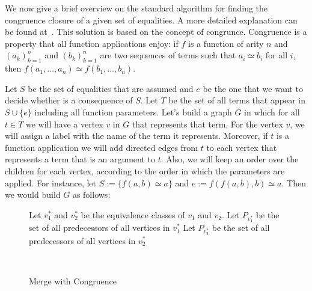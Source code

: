 We now give a brief overview on the standard algorithm for finding the congruence closure of a given set of equalities. A more detailed explanation can be found at~\cite{orig_cong_clos}. This solution is based on the concept of congrunce.
Congruence is a property that all function applications enjoy:
if $f$ is a function of arity $n$ and ${(a_{k})}_{k = 1}^{n}$ and ${(b_{k})}_{k = 1}^{n}$ are two sequences of terms such that $a_{i} \simeq b_{i}$ for all $i$, then
$f(a_{1}, \ldots, a_{n}) \simeq f(b_{1}, \ldots, b_{n})$.


Let $S$ be the set of equalities that are assumed and $e$ be the one that we want to decide whether is a consequence of $S$. Let $T$ be the set of all terms that appear in $S \cup \{e\}$ including all function parameters. Let's build a graph $G$ in which for all $t \in T$ we will have a vertex $v$ in $G$ that represents that term. For the vertex $v$, we will assign a label with the name of the term it represents. Moreover, if $t$ is a function application we will add directed edges from $t$ to each vertex that represents a term that is an argument to $t$. Also, we will keep an order over the children for each vertex, according to the order in which the parameters are applied. For instance, let $S := \{f(a, b) \simeq a\}$ and $e := f(f(a, b), b) \simeq a$. Then we would build $G$ as follows:

\renewcommand{\algorithmicforall}{\textbf{for each}}
\MakeRobust{\Call}

\begin{figure}[t]
\begin{algorithmic}[1]
    \State Let $v_{1}^{*}$ and $v_{2}^{*}$ be the equivalence classes of $v_{1}$ and $v_{2}$.
    \State Let $P_{v_{1}^{*}}$ be the set of all predecessors of all vertices in $v_{1}^{*}$
    \State Let $P_{v_{2}^{*}}$ be the set of all predecessors of all vertices in $v_{2}^{*}$
    \State{}
        \State {}
      \EndIf
    \EndFor
  \EndIf
  \EndProcedure
\end{algorithmic}
\caption{Merge with Congruence}~\label{merge_cong}
\end{figure}

